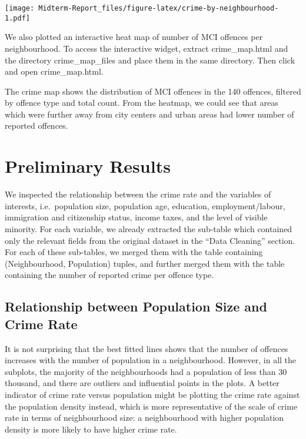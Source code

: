 \documentclass[
]{article}
\begin{document}
\texttt{[image: Midterm-Report\_files/figure-latex/crime-by-neighbourhood-1.pdf]}

We also plotted an interactive heat map of number of MCI offences per
neighbourhood. To access the interactive widget, extract crime\_map.html
and the directory crime\_map\_files and place them in the same
directory. Then click and open crime\_map.html.

The crime map shows the distribution of MCI offences in the 140
offences, filtered by offence type and total count. From the heatmap, we
could see that areas which were further away from city centers and urban
areas had lower number of reported offences.

\hypertarget{preliminary-results}{%
\section{Preliminary Results}\label{preliminary-results}}

We inspected the relationship between the crime rate and the variables
of interests, i.e.~population size, population age, education,
employment/labour, immigration and citizenship status, income taxes, and
the level of visible minority. For each variable, we already extracted
the sub-table which contained only the relevant fields from the original
dataset in the ``Data Cleaning'' section. For each of these sub-tables,
we merged them with the table containing (Neighbourhood, Population)
tuples, and further merged them with the table containing the number of
reported crime per offence type.

\hypertarget{relationship-between-population-size-and-crime-rate}{%
\subsection{Relationship between Population Size and Crime
Rate}\label{relationship-between-population-size-and-crime-rate}}

It is not surprising that the best fitted lines shows that the number of
offences increases with the number of population in a neighbourhood.
However, in all the subplots, the majority of the neighbourhoods had a
population of less than 30 thousand, and there are outliers and
influential points in the plots. A better indicator of crime rate versus
population might be plotting the crime rate against the population
density instead, which is more representative of the scale of crime rate
in terms of neighbourhood size: a neighbourhood with higher population
density is more likely to have higher crime rate.
\end{document}
